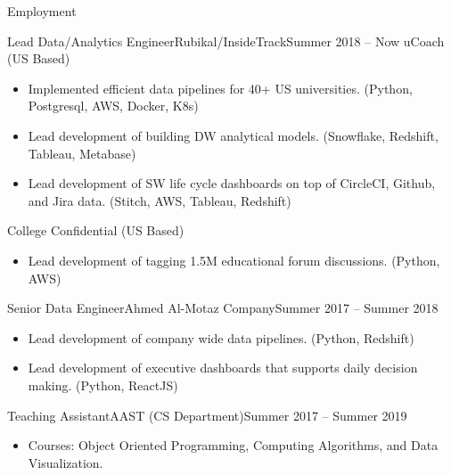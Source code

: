 \documentclass[]{ahmedamrcv}
\begin{document}
	\makeheader
	
	\begin{cvsection}{Employment}
		\begin{cvsubsection}{Lead Data/Analytics Engineer}{Rubikal/InsideTrack}{Summer 2018 -- Now}
			uCoach (US Based)			
			\begin{itemize}
				\item Implemented efficient data pipelines for 40+ US universities. (Python, Postgresql, AWS, Docker, K8s)
				\item Lead development of building DW analytical models. (Snowflake, Redshift, Tableau, Metabase)
				\item Lead development of SW life cycle dashboards on top of CircleCI, Github, and Jira data. (Stitch, AWS, Tableau, Redshift)
			\end{itemize}
			College Confidential (US Based)
			\begin{itemize}
			    \item Lead development of tagging 1.5M educational forum discussions. (Python, AWS)
			\end{itemize}
		\end{cvsubsection}
		
		\begin{cvsubsection}{Senior Data Engineer}{Ahmed Al-Motaz Company}{Summer 2017 -- Summer 2018}	
			\begin{itemize}
				\item Lead development of company wide data pipelines. (Python, Redshift)
				\item Lead development of executive dashboards that supports daily decision making. (Python, ReactJS)
			\end{itemize}
		\end{cvsubsection}
		
		\begin{cvsubsection}{Teaching Assistant}{AAST (CS Department)}{Summer 2017 -- Summer 2019}		
			\begin{itemize}
				\item Courses: Object Oriented Programming, Computing Algorithms, and Data Visualization.
			\end{itemize}
		\end{cvsubsection}
		

\end{cvsection}
\end{document}
